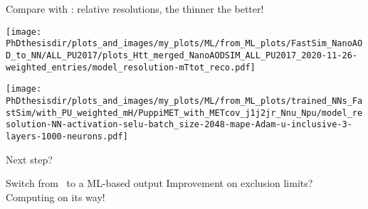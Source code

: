 \addtocounter{framenumber}{-1}
\begin{frame}

\vspace{-5pt}
\manip Compare with \mTtot: relative resolutions, the thinner the better!

\vspace{5pt}

\begin{minipage}[c]{.475\textwidth}
\begin{center}\vspace{-4pt}
\texttt{[image: \\PhDthesisdir/plots\_and\_images/my\_plots/ML/from\_ML\_plots/FastSim\_NanoAOD\_to\_NN/ALL\_PU2017/plots\_Htt\_merged\_NanoAODSIM\_ALL\_PU2017\_2020-11-26-weighted\_entries/model\_resolution-mTtot\_reco.pdf]}
\end{center}\vspace{-5pt}
\end{minipage}
\hfill
\begin{minipage}[c]{.475\textwidth}
\begin{center}\vspace{-4pt}
\texttt{[image: \\PhDthesisdir/plots\_and\_images/my\_plots/ML/from\_ML\_plots/trained\_NNs\_FastSim/with\_PU\_weighted\_mH/PuppiMET\_with\_METcov\_j1j2jr\_Nnu\_Npu/model\_resolution-NN-activation-selu-batch\_size-2048-mape-Adam-u-inclusive-3-layers-1000-neurons.pdf]}
\end{center}\vspace{-5pt}
\end{minipage}

\end{frame}

\begin{frame}{Next step?}

\manip Switch from \mTtot\ to a ML-based output
\manip Improvement on exclusion limits?
\manip Computing on its way!

\end{frame}